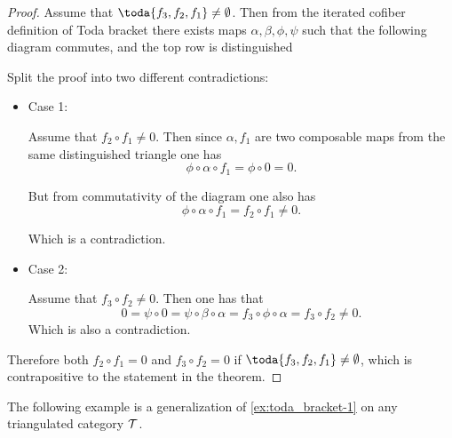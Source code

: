 \begin{proof}
	Assume that \( \toda{f_3, f_2, f_1} \neq \emptyset \). Then from the iterated cofiber definition of Toda bracket there exists maps \(\alpha, \beta, \phi, \psi \) such that the following diagram commutes, and the top row is distinguished
	\begin{center}
	\end{center}

	Split the proof into two different contradictions:

	\begin{itemize}
		\item{
			Case 1:

			Assume that \( f_2 \circ f_1 \neq 0 \). Then since \( \alpha, f_1 \) are two composable maps from the same distinguished triangle one has
			\[
				\phi \circ \alpha \circ f_1 = \phi \circ 0 = 0.
			\]

			But from commutativity of the diagram one also has
			\[
				\phi \circ \alpha \circ f_1 = f_2 \circ f_1 \neq 0.
			\]

			Which is a contradiction.
		}
		\item{
			Case 2:

			Assume that \( f_3 \circ f_2 \neq 0 \). Then one has that
			\[
				0 = \psi \circ 0 = \psi \circ \beta \circ \alpha = f_3 \circ \phi \circ \alpha = f_3 \circ f_2 \neq 0.
			\]
			Which is also a contradiction.
		}
	\end{itemize}

	Therefore both \( f_2 \circ f_1 = 0 \) and \( f_3 \circ f_2 = 0 \) if \( \toda{f_3, f_2, f_1} \neq \emptyset \), which is contrapositive to the statement in the theorem.
\end{proof}

The following example is a generalization of \autoref{ex:toda_bracket-1} on any triangulated category \( {\mathcal{T}} \).

